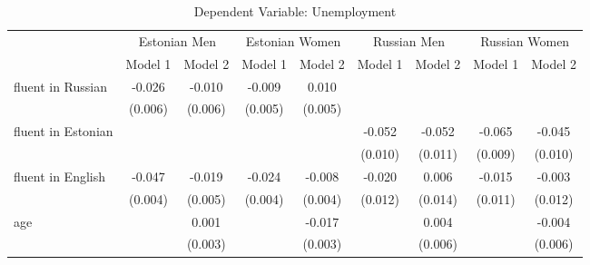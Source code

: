 \begin{sidewaystable}
	\caption{Dependent Variable: Unemployment}

\begin{tabular}{l*{2}{c}| *{2}{c}| *{2}{c}| *{2}{c}}
			\toprule
	& \multicolumn{2}{c|}{Estonian Men} & \multicolumn{2}{c|}{Estonian Women} & \multicolumn{2}{c|}{Russian Men} & \multicolumn{2}{c}{Russian Women} \\ 

	
	&\multicolumn{1}{c}{Model 1}&\multicolumn{1}{c|}{Model 2}&\multicolumn{1}{c}{Model 1}&\multicolumn{1}{c|}{Model 2}&\multicolumn{1}{c}{Model 1}&\multicolumn{1}{c|}{Model 2}&\multicolumn{1}{c}{Model 1}&\multicolumn{1}{c}{Model 2}\\
	\midrule
fluent in Russian   &      -0.026\sym{***}&      -0.010         &      -0.009\sym{*}  &       0.010\sym{**} &                     &                     &                     &                     \\
&     (0.006)         &     (0.006)         &     (0.005)         &     (0.005)         &                     &                     &                     &                     \\
fluent in Estonian  &                     &                     &                     &                     &      -0.052\sym{***}&      -0.052\sym{***}&      -0.065\sym{***}&      -0.045\sym{***}\\
&                     &                     &                     &                     &     (0.010)         &     (0.011)         &     (0.009)         &     (0.010)         \\
fluent in English   &      -0.047\sym{***}&      -0.019\sym{***}&      -0.024\sym{***}&      -0.008\sym{*}  &      -0.020         &       0.006         &      -0.015         &      -0.003         \\
&     (0.004)         &     (0.005)         &     (0.004)         &     (0.004)         &     (0.012)         &     (0.014)         &     (0.011)         &     (0.012)         \\
age                 &                     &       0.001         &                     &      -0.017\sym{***}&                     &       0.004         &                     &      -0.004         \\
&                     &     (0.003)         &                     &     (0.003)         &                     &     (0.006)         &                     &     (0.006)         \\

\end{tabular}
\end{sidewaystable}
